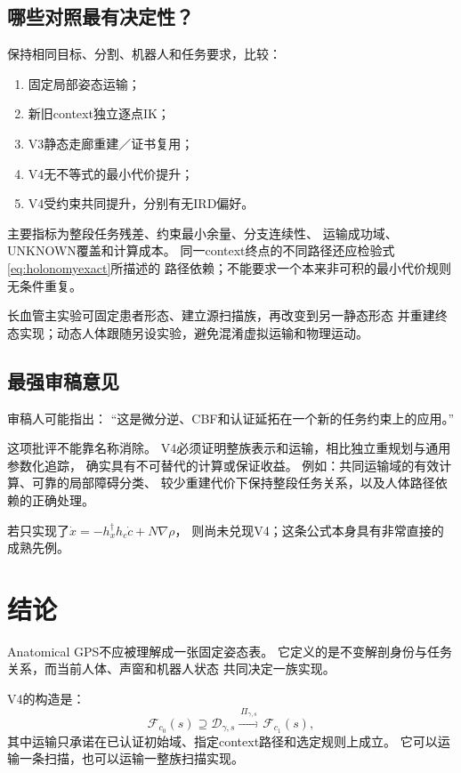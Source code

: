 \documentclass[UTF8,11pt,a4paper,fontset=fandol]{ctexart}
\numberwithin{equation}{section}
\theoremstyle{definition}
\begin{document}
\subsection{哪些对照最有决定性？}

保持相同目标、分割、机器人和任务要求，比较：
\begin{enumerate}
\item 固定局部姿态运输；
\item 新旧context独立逐点IK；
\item V3静态走廊重建／证书复用；
\item V4无不等式的最小代价提升；
\item V4受约束共同提升，分别有无IRD偏好。
\end{enumerate}
主要指标为整段任务残差、约束最小余量、分支连续性、
运输成功域、UNKNOWN覆盖和计算成本。
同一context终点的不同路径还应检验式\eqref{eq:holonomyexact}所描述的
路径依赖；不能要求一个本来非可积的最小代价规则无条件重复。

长血管主实验可固定患者形态、建立源扫描族，再改变到另一静态形态
并重建终态实现；动态人体跟随另设实验，避免混淆虚拟运输和物理运动。

\subsection{最强审稿意见}

审稿人可能指出：
``这是微分逆、CBF和认证延拓在一个新的任务约束上的应用。''

这项批评不能靠名称消除。
V4必须证明整族表示和运输，相比独立重规划与通用参数化追踪，
确实具有不可替代的计算或保证收益。
例如：共同运输域的有效计算、可靠的局部障碍分类、
较少重建代价下保持整段任务关系，以及人体路径依赖的正确处理。

若只实现了$\dot x=-h_x^\dagger h_c\dot c+N\nabla\rho$，
则尚未兑现V4；这条公式本身具有非常直接的成熟先例。

\section{结论}

Anatomical GPS不应被理解成一张固定姿态表。
它定义的是不变解剖身份与任务关系，而当前人体、声窗和机器人状态
共同决定一族实现。

V4的构造是：
\begin{equation}
 \boxed{
 \mathcal F_{c_0}(s)
 \supseteq\mathcal D_{\gamma,s}
 \xrightarrow{\ \Pi_{\gamma,s}\ }
 \mathcal F_{c_1}(s),
 }
\end{equation}
其中运输只承诺在已认证初始域、指定context路径和选定规则上成立。
它可以运输一条扫描，也可以运输一整族扫描实现。
\end{document}
